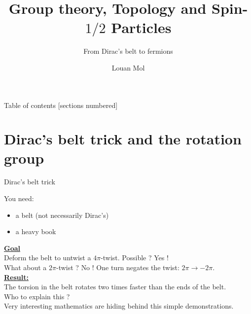 \documentclass[9pt]{beamer}
\title{Group theory, Topology and Spin-$1/2$ Particles}
\subtitle{From Dirac's belt to fermions}
\date{}
\author{Louan Mol}
\institute{Unversité Libre de Bruxelles\\[2cm]{\small Brussels Summer School of Mathematics 2022}}
\renewcommand{\emph}{\alert}
\begin{document}
\maketitle

\nocite{*}

\begin{frame}{Table of contents}
    [sections numbered]
    \tableofcontents%
\end{frame}

\section{Dirac's belt trick and the rotation group}

\begin{frame}{Dirac's belt trick}
    
    You need:
    \begin{itemize}
        \item a belt (not necessarily Dirac's)
        \item a heavy book
    \end{itemize}

    \textbf{\underline{Goal}}\\ [0.2cm]

    Deform the belt to untwist a $4\pi$-twist. Possible ? \emph{Yes !}\\[0.2cm]

    What about a $2\pi$-twist ? \emph{No !} One turn negates the twist: $2\pi\to-2\pi$.\\[0.2cm]

    \textbf{\underline{Result:}} \\[0.2cm]
    
    The torsion in the belt rotates two times faster than the ends of the belt.\\[0.2cm]
    
    Who to explain this ?\\ [0.2cm]
    Very interesting mathematics are hiding behind this simple demonstrations.

\end{frame}
\end{document}
